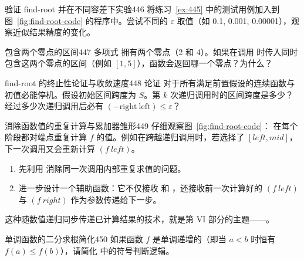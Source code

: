 \begin{exercise}{验证 find-root 并在不同容差下实验}{446}\label{ex:446}
将练习~\ref{ex:445} 中的测试用例加入到图~\ref{fig:find-root-code} 的程序中。尝试不同的 $\varepsilon$ 取值（如 0.1, 0.001, 0.00001），观察近似结果精度的变化。
\end{exercise}

\begin{exercise}{包含两个零点的区间}{447}\label{ex:447}
多项式  拥有两个零点（2 和 4）。如果在调用  时传入同时包含这两个零点的区间（例如 $[1, 5]$），函数会返回哪一个零点？为什么？
\end{exercise}

\begin{exercise}{find-root 的终止性论证与收敛速度}{448}\label{ex:448}
论证  对于所有满足前置假设的连续函数与初值必能停机。假设初始区间跨度为 $S$。第 $k$ 次递归调用时的区间跨度是多少？经过多少次递归调用后必有 $(- \text{right}\ \text{left}) \le \varepsilon$？
\end{exercise}

\begin{exercise}{消除函数值的重复计算与累加器雏形}{449}\label{ex:449}
仔细观察图~\ref{fig:find-root-code}： 在每个阶段都对端点重复计算 $f$ 的值。例如在跨越递归调用时，若选择了 $[left, mid]$，下一次调用又会重新计算 $(f\ left)$。
\begin{enumerate}
  \item 先利用  消除同一次调用内部重复求值的问题。
  \item 进一步设计一个辅助函数：它不仅接收  和 ，还接收前一次计算好的 $(f\ left)$ 与 $(f\ right)$ 作为参数传递给下一步。
\end{enumerate}
这种随数值递归同步传递已计算结果的技术，就是第 VI 部分的主题——。
\end{exercise}

\begin{exercise}{单调函数的二分求根简化}{450}\label{ex:450}
如果函数 $f$ 是单调递增的（即当 $a < b$ 时恒有 $f(a) \le f(b)$），请简化  中的符号判断逻辑。
\end{exercise}

